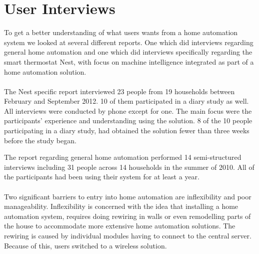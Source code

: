 \section{User Interviews}
\label{sec:interviewReports}
To get a better understanding of what users wants from a home automation system we looked at several different reports. One which did interviews regarding general home automation\cite{HAInterviews} and one which did interviews specifically regarding the smart thermostat Nest, with focus on machine intelligence integrated as part of a home automation solution\cite{AdaptiveInterviews}. 
\\\\
The Nest specific report interviewed 23 people from 19 households between February and September 2012. 10 of them participated in a diary study as well. All interviews were conducted by phone except for one. The main focus were the participants' experience and understanding using the solution. 8 of the 10 people participating in a diary study, had obtained the solution fewer than three weeks before the study began\cite{AdaptiveInterviews}. 

The report regarding general home automation performed 14 semi-structured interviews including 31 people across 14 households in the summer of 2010. All of the participants had been using their system for at least a year\cite{HAInterviews}.
\\\\
Two significant barriers to entry into home automation are inflexibility and poor manageability\cite{HAInterviews}. Inflexibility is concerned with the idea that installing a home automation system, requires doing rewiring in walls or even remodelling parts of the house to accommodate more extensive home automation solutions. The rewiring is caused by individual modules having to connect to the central server. Because of this, users switched to a wireless solution\cite{HAInterviews}.

